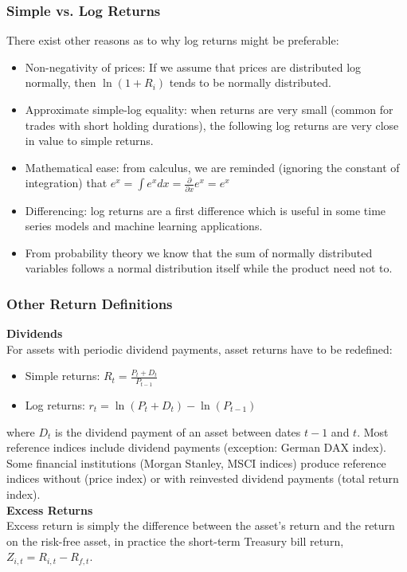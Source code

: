 \documentclass[xcolor=dvipsnames, english, 8pt]{beamer}
\begin{document}
\begin{frame}
    \frametitle{ Simple vs. Log Returns}
There exist other reasons as to why log returns might be preferable: \vspace{0.25cm}\\
\begin{itemize}
\item  Non-negativity of prices: If we assume that prices are distributed log normally, then $ \ln(1 + R_i)$ tends to be normally distributed.
\item Approximate simple-log equality: when returns are very small (common for trades with short holding durations), the following log returns are very close in value to simple returns.
\item  Mathematical ease: from calculus, we are reminded (ignoring the constant of integration) that $e^x = \int e^x dx = \frac{\partial}{\partial x} e^x = e^x$
\item Differencing: log returns are a first difference which is useful in some time series models and machine learning applications.
\item From probability theory we know that the sum of normally distributed variables follows a normal distribution itself while the product need not to.
\end{itemize}
\end{frame}

\begin{frame}
    \frametitle{Other Return Definitions}
\textbf{Dividends}\vspace{0.25cm}\\
For assets with periodic dividend payments, asset returns have to be redefined:\vspace{0.25cm}\\
\begin{itemize}
    \item Simple returns: $R_t = \frac{P_t + D_t}{P_{t-1}}$
    \item Log returns: $r_t = \ln(P_t + D_t) - \ln(P_{t-1})$\vspace{0.25cm}\\
\end{itemize}
where $D_t$ is the dividend payment of an asset between dates $t-1$ and $t$. Most reference indices include dividend payments (exception: German DAX index). Some financial institutions (Morgan Stanley, MSCI indices) produce reference indices
without (price index) or with reinvested dividend payments (total return index).\vspace{0.5cm}\\

\textbf{Excess Returns}\vspace{0.25cm}\\
Excess return is simply the difference between the asset's return and the return on the
risk-free asset, in practice the short-term Treasury bill return, $Z_{i,t} = R_{i,t} - R_{f,t}$.
\end{frame}
\end{document}
